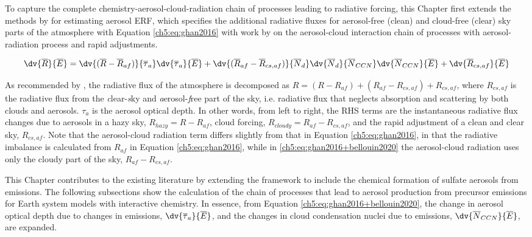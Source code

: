 To capture the complete chemistry-aerosol-cloud-radiation chain of processes leading to radiative forcing, this Chapter first extends the methods by \citet{ghanMinimalRepresentationAerosols2012} for estimating aerosol ERF, which specifies the additional radiative fluxes for aerosol-free (clean) and cloud-free (clear) sky parts of the atmosphere with Equation \ref{ch5:eq:ghan2016} with work by \citet{bellouinBoundingGlobalAerosol2020} on the aerosol-cloud interaction chain of processes with aerosol-radiation process and rapid adjustments.


\begin{equation}\label{ch5:eq:ghan2016+bellouin2020}
    \begin{aligned}
        \dv{\overline{R}}{\overline{E}} = 
            \dv{(\overline{R}-\overline{R}_{af})}{\overline{\tau}_a}
            \dv{\overline{\tau}_a}{\overline{E}} +
            \dv{(\overline{R}_{af}-\overline{R}_{cs,af})}{\overline{N}_d} 
            \dv{\overline{N}_d}{\overline{N}_{CCN}} 
            \dv{\overline{N}_{CCN}}{\overline{E}} + 
            \dv{\overline{R}_{cs,af}}{\overline{E}}
    \end{aligned}
\end{equation}

As recommended by \citet{ghanMinimalRepresentationAerosols2012}, the radiative flux of the atmosphere is decomposed as $R=(R-R_{af})+(R_{af}-R_{cs,af})+ R_{cs,af}$, where $R_{cs,af}$ is the radiative flux from the \textit{c}lear-\textit{s}ky and \textit{a}erosol-\textit{f}ree part of the sky, i.e. radiative flux that neglects absorption and scattering by both clouds and aerosols. $\tau_a$ is the aerosol optical depth. In other words, from left to right, the RHS terms are the instantaneous radiative flux changes due to aerosols in a hazy sky, $R_{hazy}=R-R_{af}$, cloud forcing, $R_{cloudy}=R_{af}-R_{cs,af}$, and the rapid adjustment of a clean and clear sky, $R_{cs,af}$. Note that the aerosol-cloud radiation term differs slightly from that in Equation \ref{ch5:eq:ghan2016}, in that the radiative imbalance is calculated from $R_{af}$ in Equation \ref{ch5:eq:ghan2016}, while in \ref{ch5:eq:ghan2016+bellouin2020} the aerosol-cloud radiation uses only the cloudy part of the sky, $R_{af}-R_{cs,af}$.

This Chapter contributes to the existing literature by extending the framework to include the chemical formation of sulfate aerosols from  emissions. The following subsections show the calculation of the chain of processes that lead to aerosol production from precursor emissions for Earth system models with interactive chemistry. In essence, from Equation \ref{ch5:eq:ghan2016+bellouin2020}, the change in aerosol optical depth due to changes in emissions, $\dv{\overline{\tau}_a}{\overline{E}}$, and the changes in cloud condensation nuclei due to emissions, $\dv{\overline{N}_{CCN}}{\overline{E}}$, are expanded.

